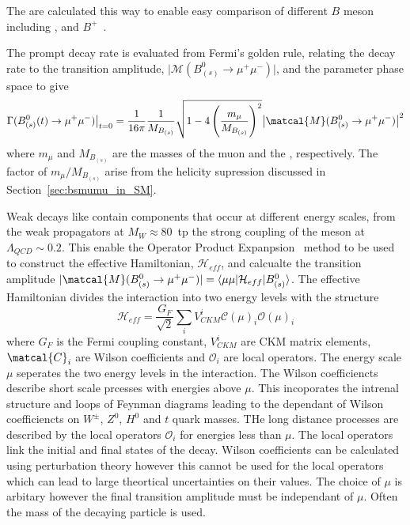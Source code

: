 {{The \BFs are calculated this way to enable easy comparison of different $B$ meson \BFs including \bd, \bs and $B^+$~\cite{}.

The prompt decay rate is evaluated from Fermi's golden rule, relating the decay rate  to the transition amplitude, $\big|\mathcal{M}(B^0_{(s)} \to \mu^+ \mu^-)\big|$, and the parameter phase space to give~\cite{}
\begin{equation}
\Gamma(B^0_{(s)}(t) \to \mu^+ \mu^-)\big{|}_{t=0} = \frac{1}{16\pi} \frac{1}{M_{B_{(s)}}} \sqrt{1 -4 \left (\frac{m_{\mu}}{M_{B_{(s)}}} \right )^2} \big|\matcal{M}(B^0_{(s)} \to \mu^+ \mu^-)\big|^2
\label{sec:FGR}
\end{equation}
where $m_{\mu}$ and $M_{B_{(s)}}$ are the masses of the muon and the \bsd, respectively. The factor of $m_{\mu}/M_{B_{(s)}}$ arise from the helicity supression discussed in Section~\ref{sec:bsmumu_in_SM}.


Weak decays like \bmumu contain components that occur at different energy scales, from the weak propagators at $M_W \approx 80$~\gevcc tp the strong coupling of the \bsd meson at $\Lambda_{QCD} \sim 0.2$\gev. This enable the Operator Product Expanpsion~\cite{} method to be used to construct the effective Hamiltonian, $\mathcal{H}_{eff}$, and calcualte the transition amplitude $|\matcal{M}(B^0_{(s)} \to \mu^+ \mu^-)| = \langle \mu \mu | \mathcal{H}_{eff} | B^0_{(s)} \rangle$. The effective Hamiltonian divides the interaction into two energy levels with the structure
\begin{equation}
\mathcal{H}_{eff}  = \frac{G_F}{\sqrt{2}} \displaystyle\sum_{i} V^i_{CKM} \mathcal{C}(\mu)_i \mathcal{O}(\mu)_i
\label{sec:eff_hamil_def}
\end{equation}
where $G_F$ is the Fermi coupling constant, $V_{CKM}^i$ are CKM matrix elements, $\matcal{C}_i$ are Wilson coefficients and $\mathcal{O}_i$ are local operators. The energy scale $\mu$ seperates the two energy levels in the interaction. The Wilson coefficiencts describe short scale prcesses with energies above $\mu$. This incoporates the intrenal structure and loops of Feynman diagrams leading to the dependant of Wilson coefficiencts on $W^{\pm}$, $Z^0$, $H^0$ and $t$ quark masses. THe long distance processes are described by the local operators $\mathcal{O}_i$ for energies less than $\mu$. The local operators link the initial and final states of the decay.%
Wilson coefficients can be calculated using perturbation theory however this cannot be used for the local operators which can lead to large theortical uncertainties on their values. The choice of $\mu$ is arbitary however the final transition amplitude must be independant of $\mu$. Often the mass of the decaying particle is used. 

}}
